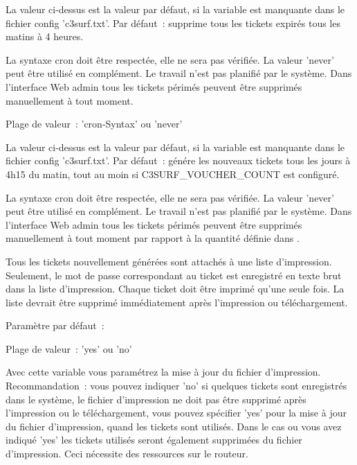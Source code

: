 \begin{description}
  La valeur ci-dessus est la valeur par défaut, si la variable est manquante dans le fichier
  config 'c3surf.txt'.
  Par défaut~: supprime tous les tickets expirés tous les matins à 4 heures.

  La syntaxe cron doit être respectée, elle ne sera pas vérifiée. La valeur 'never' peut être utilisé
  en complément. Le travail n'est pas planifié par le système. Dans l'interface Web admin tous
  les tickets périmés peuvent être supprimés manuellement à tout moment.



   Plage de valeur~: 'cron-Syntax' ou 'never'

  La valeur ci-dessus est la valeur par défaut, si la variable est manquante dans le fichier
  config 'c3surf.txt'.
  Par défaut~: génére les nouveaux tickets tous les jours à 4h15 du matin, tout au moin si C3SURF\_VOUCHER\_COUNT
  est configuré.

  La syntaxe cron doit être respectée, elle ne sera pas vérifiée. La valeur 'never' peut être utilisé
  en complément. Le travail n'est pas planifié par le système. Dans l'interface Web admin tous
  les tickets périmés peuvent être supprimés manuellement à tout moment par rapport à la quantité
  définie dans .

  Tous les tickets nouvellement générées sont attachés à une liste d'impression. Seulement, le mot
  de passe correspondant au ticket est enregistré en texte brut dans la liste d'impression. Chaque
  ticket doit être imprimé qu'une seule fois. La liste devrait être supprimé immédiatement après
  l'impression ou téléchargement.


   Paramètre par défaut~: 

   Plage de valeur~: 'yes' ou 'no'

   Avec cette variable vous paramétrez la mise à jour du fichier d'impression. Recommandation~:
   vous pouvez indiquer 'no' si quelques tickets sont enregistrés dans le système, le fichier
   d'impression ne doit pas être supprimé après l'impression ou le téléchargement, vous pouvez
   spécifier 'yes' pour la mise à jour du fichier d'impression, quand les tickets sont utilisés.
   Dans le cas ou vous avez indiqué 'yes' les tickets utilisés seront également supprimées du
   fichier d'impression. Ceci nécessite des ressources sur le routeur.


\end{description}
